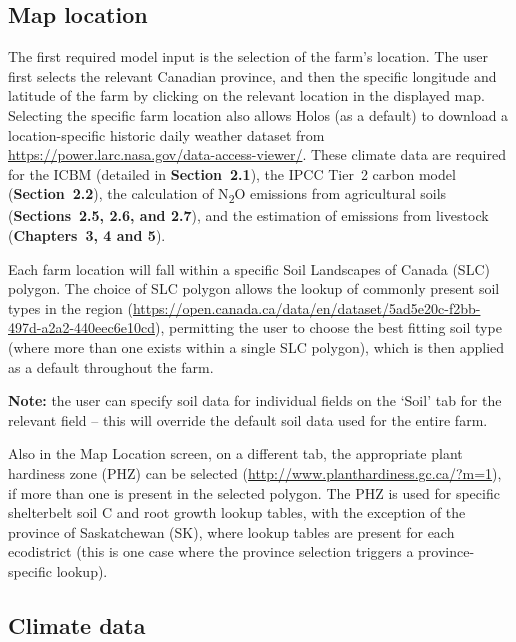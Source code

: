 \subsection{Map location}
\label{subsec:map}

The first required model input is the selection of the farm's location. The
user first selects the relevant Canadian province, and then the specific
longitude and latitude of the farm by clicking on the relevant location in the
displayed map. Selecting the specific farm location also allows Holos (as a
default) to download a location-specific historic daily weather dataset from
\url{https://power.larc.nasa.gov/data-access-viewer/}. These climate data are
required for the ICBM (detailed in \textbf{Section~2.1}), the IPCC Tier~2
carbon model (\textbf{Section~2.2}), the calculation of N\textsubscript{2}O
emissions from agricultural soils (\textbf{Sections~2.5, 2.6, and 2.7}), and
the estimation of emissions from livestock (\textbf{Chapters~3, 4 and 5}).

Each farm location will fall within a specific Soil Landscapes of Canada (SLC)
polygon. The choice of SLC polygon allows the lookup of commonly present soil
types in the region
(\url{https://open.canada.ca/data/en/dataset/5ad5e20c-f2bb-497d-a2a2-440eec6e10cd}),
permitting the user to choose the best fitting soil type (where more than one
exists within a single SLC polygon), which is then applied as a default
throughout the farm.

\textbf{Note:} the user can specify soil data for individual fields on the
`Soil' tab for the relevant field -- this will override the default soil data
used for the entire farm.

Also in the Map Location screen, on a different tab, the appropriate plant
hardiness zone (PHZ) can be selected
(\url{http://www.planthardiness.gc.ca/?m=1}), if more than one is present in
the selected polygon. The PHZ is used for specific shelterbelt soil C and root
growth lookup tables, with the exception of the province of Saskatchewan (SK),
where lookup tables are present for each ecodistrict (this is one case where
the province selection triggers a province-specific lookup).

\subsection{Climate data}
\label{subsec:climate}


